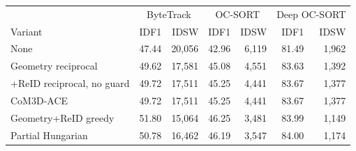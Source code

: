 \begin{tabular}{lrr@{\hspace{7pt}}rr@{\hspace{7pt}}rr}
\toprule
& \multicolumn{2}{c}{ByteTrack} & \multicolumn{2}{c}{OC-SORT} & \multicolumn{2}{c}{Deep OC-SORT} \\
Variant & IDF1 & IDSW & IDF1 & IDSW & IDF1 & IDSW \\
\midrule
None & 47.44 & 20,056 & 42.96 & 6,119 & 81.49 & 1,962 \\
Geometry reciprocal & 49.62 & 17,581 & 45.08 & 4,551 & 83.63 & 1,392 \\
+ReID reciprocal, no guard & 49.72 & 17,511 & 45.25 & 4,441 & 83.67 & 1,377 \\
CoM3D-ACE & 49.72 & 17,511 & 45.25 & 4,441 & 83.67 & 1,377 \\
Geometry+ReID greedy & 51.80 & 15,064 & 46.25 & 3,481 & 83.99 & 1,149 \\
Partial Hungarian & 50.78 & 16,462 & 46.19 & 3,547 & 84.00 & 1,174 \\
\bottomrule
\end{tabular}
